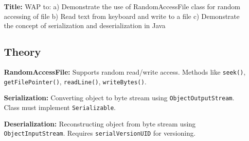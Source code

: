\documentclass[10pt,a4paper]{article}
\begin{document}
\textbf{Title:} WAP to: a) Demonstrate the use of RandomAccessFile class for random accessing of file b) Read text from keyboard and write to a file c) Demonstrate the concept of serialization and deserialization in Java

\subsection*{Theory}
\textbf{RandomAccessFile:} Supports random read/write access. Methods like \texttt{seek()}, \texttt{getFilePointer()}, \texttt{readLine()}, \texttt{writeBytes()}.

\textbf{Serialization:} Converting object to byte stream using \texttt{ObjectOutputStream}. Class must implement \texttt{Serializable}.

\textbf{Deserialization:} Reconstructing object from byte stream using \texttt{ObjectInputStream}. Requires \texttt{serialVersionUID} for versioning.
\end{document}
